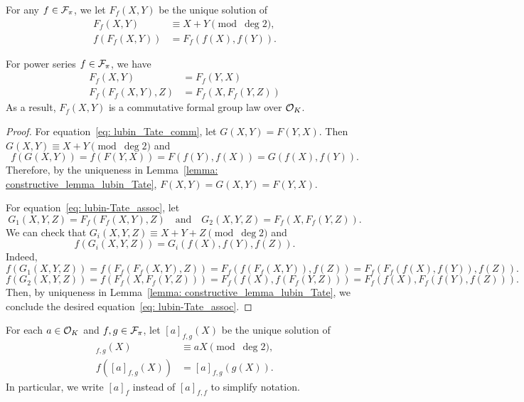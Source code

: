 \begin{definition}
    For any $f \in \mathcal{F}_\pi$, we let $F_f(X,Y)$ be the unique solution of
    \begin{align*}
        F_f(X,Y) &\equiv X + Y \pmod{\deg 2}, \\
        f(F_f(X,Y)) &= F_f(f(X), f(Y)).
    \end{align*}
\end{definition}


\begin{theorem}
    For power series $f \in \mathcal{F}_\pi$, we have
    \begin{align}
        F_f(X,Y) &= F_f(Y,X) \label{eq: lubin_Tate_comm} \\
        F_f(F_f(X,Y),Z) &= F_f(X, F_f(Y,Z)) \label{eq: lubin-Tate_assoc}
    \end{align}
     As a result, $F_f(X,Y)$ is a commutative formal group law over $\mathcal{O}_K$.

    \label{thm: Lubin_Tate}
\end{theorem}

\begin{proof}
    For equation~\eqref{eq: lubin_Tate_comm}, let $G (X,Y)= F(Y,X)$. Then $G(X,Y)
    \equiv X+Y \pmod{\deg 2}$ and
    \[f(G(X,Y)) = f(F(Y,X)) = F(f(Y),f(X)) = G(f(X),f(Y)). \]
    Therefore, by the uniqueness in Lemma~\ref{lemma: constructive_lemma_lubin_Tate},
    $F(X,Y) = G(X,Y) = F(Y,X)$.

    For equation~\eqref{eq: lubin-Tate_assoc}, let
    \[ G_1(X,Y,Z) = F_f(F_f(X,Y),Z) \quad \text{and} \quad
    G_2(X,Y,Z) = F_f(X,F_f(Y,Z)).\]
    We can check that $G_i(X,Y,Z) \equiv X+Y+Z \pmod{\deg 2}$ and
    \begin{equation*}
        f(G_i(X,Y,Z)) = G_i(f(X),f(Y),f(Z)).
    \end{equation*}
    Indeed,
    \[f(G_1(X,Y,Z)) = f(F_f(F_f(X,Y), Z)) = F_f(f(F_f(X,Y)), f(Z)) =
    F_f(F_f(f(X), f(Y)), f(Z)). \]
    \[f(G_2(X,Y,Z)) = f(F_f(X, F_f(Y,Z))) = F_f(f(X), f(F_f(Y,Z))) =
    F_f(f(X), F_f(f(Y), f(Z))).  \]
    Then, by uniqueness in Lemma~\ref{lemma: constructive_lemma_lubin_Tate},
    we conclude the desired equation~\eqref{eq: lubin-Tate_assoc}.
\end{proof}


\begin{definition}
    For each $a \in \mathcal{O}_K$ and $f, g \in \mathcal{F}_\pi$, let $[a]_{f,g} (X)$ be the unique
    solution of
    \begin{align}
        [a]_{f,g} (X) &\equiv aX \pmod{\deg 2}, \\
        f([a]_{f,g}(X)) &= [a]_{f, g}(g(X)). \label{eq: LT_smul}
    \end{align}
    In particular, we write $[a]_{f}$ instead of $[a]_{f,f}$ to simplify notation.
\end{definition}

